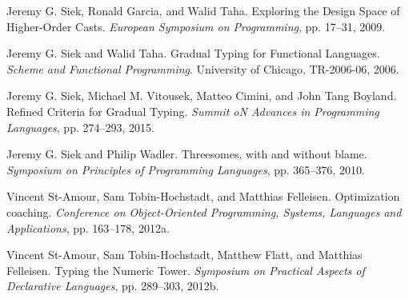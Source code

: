 \documentclass[screen=true, 10pt, acmsmall]{acmart}
\newenvironment{SingleColumn}{\begin{list}{}{\topsep=0pt\partopsep=0pt%
\listparindent=0pt\itemindent=0pt\labelwidth=0pt\leftmargin=0pt\rightmargin=0pt%
\itemsep=0pt\parsep=0pt}\item}{\end{list}}
\newenvironment{AutoBibliography}{\begin{small}}{\end{small}}
\newcommand{\Autobibentry}[1]{\hspace{0.05\linewidth}\parbox[t]{0.95\linewidth}{\parindent=-0.05\linewidth#1\vspace{1.0ex}}}
\begin{document}
\begin{AutoBibliography}
\begin{SingleColumn}
\label{t:x28autobib_x22Jeremy_Gx2e_Siekx2c_Ronald_Garciax2c_and_Walid_TahaExploring_the_Design_Space_of_Higherx2dOrder_CastsEuropean_Symposium_on_Programmingx2c_ppx2e_17x2dx2d312009x22x29}\Autobibentry{Jeremy G. Siek, Ronald Garcia, and Walid Taha. Exploring the Design Space of Higher{-}Order Casts. \textit{European Symposium on Programming}, pp. 17{--}31, 2009.}

\label{t:x28autobib_x22Jeremy_Gx2e_Siek_and_Walid_TahaGradual_Typing_for_Functional_LanguagesScheme_and_Functional_Programmingx2e_University_of_Chicagox2c_TRx2d2006x2d062006x22x29}\Autobibentry{Jeremy G. Siek and Walid Taha. Gradual Typing for Functional Languages. \textit{Scheme and Functional Programming}. University of Chicago, TR{-}2006{-}06, 2006.}

\label{t:x28autobib_x22Jeremy_Gx2e_Siekx2c_Michael_Mx2e_Vitousekx2c_Matteo_Ciminix2c_and_John_Tang_BoylandRefined_Criteria_for_Gradual_TypingSummit_oN_Advances_in_Programming_Languagesx2c_ppx2e_274x2dx2d2932015x22x29}\Autobibentry{Jeremy G. Siek, Michael M. Vitousek, Matteo Cimini, and John Tang Boyland. Refined Criteria for Gradual Typing. \textit{Summit oN Advances in Programming Languages}, pp. 274{--}293, 2015.}

\label{t:x28autobib_x22Jeremy_Gx2e_Siek_and_Philip_WadlerThreesomesx2c_with_and_without_blameSymposium_on_Principles_of_Programming_Languagesx2c_ppx2e_365x2dx2d3762010x22x29}\Autobibentry{Jeremy G. Siek and Philip Wadler. Threesomes, with and without blame. \textit{Symposium on Principles of Programming Languages}, pp. 365{--}376, 2010.}

\label{t:x28autobib_x22Vincent_Stx2dAmourx2c_Sam_Tobinx2dHochstadtx2c_and_Matthias_FelleisenOptimization_coachingConference_on_Objectx2dOriented_Programmingx2c_Systemsx2c_Languages_and_Applicationsx2c_ppx2e_163x2dx2d1782012x22x29}\Autobibentry{Vincent St{-}Amour, Sam Tobin{-}Hochstadt, and Matthias Felleisen. Optimization coaching. \textit{Conference on Object{-}Oriented Programming, Systems, Languages and Applications}, pp. 163{--}178, 2012a.}

\label{t:x28autobib_x22Vincent_Stx2dAmourx2c_Sam_Tobinx2dHochstadtx2c_Matthew_Flattx2c_and_Matthias_FelleisenTyping_the_Numeric_TowerSymposium_on_Practical_Aspects_of_Declarative_Languagesx2c_ppx2e_289x2dx2d3032012x22x29}\Autobibentry{Vincent St{-}Amour, Sam Tobin{-}Hochstadt, Matthew Flatt, and Matthias Felleisen. Typing the Numeric Tower. \textit{Symposium on Practical Aspects of Declarative Languages}, pp. 289{--}303, 2012b.}


\end{SingleColumn}
\end{AutoBibliography}
\end{document}
